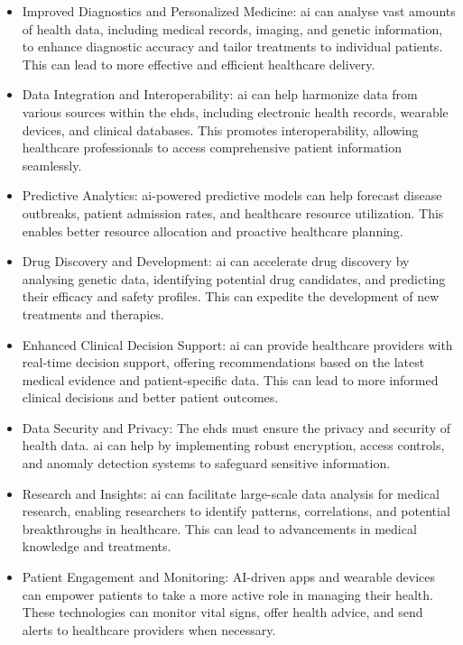 \begin{itemize}
    \item Improved Diagnostics and Personalized Medicine: \ac{ai} can analyse vast amounts of health data, including medical records, imaging, and genetic information, to enhance diagnostic accuracy and tailor treatments to individual patients. This can lead to more effective and efficient healthcare delivery.
\item Data Integration and Interoperability: \ac{ai} can help harmonize data from various sources within the \ac{ehds}, including electronic health records, wearable devices, and clinical databases. This promotes interoperability, allowing healthcare professionals to access comprehensive patient information seamlessly.

\item Predictive Analytics: \ac{ai}-powered predictive models can help forecast disease outbreaks, patient admission rates, and healthcare resource utilization. This enables better resource allocation and proactive healthcare planning.

\item Drug Discovery and Development: \ac{ai} can accelerate drug discovery by analysing genetic data, identifying potential drug candidates, and predicting their efficacy and safety profiles. This can expedite the development of new treatments and therapies.

\item Enhanced Clinical Decision Support: \ac{ai} can provide healthcare providers with real-time decision support, offering recommendations based on the latest medical evidence and patient-specific data. This can lead to more informed clinical decisions and better patient outcomes.

\item Data Security and Privacy: The \ac{ehds} must ensure the privacy and security of health data. \ac{ai} can help by implementing robust encryption, access controls, and anomaly detection systems to safeguard sensitive information.

\item Research and Insights: \ac{ai} can facilitate large-scale data analysis for medical research, enabling researchers to identify patterns, correlations, and potential breakthroughs in healthcare. This can lead to advancements in medical knowledge and treatments.

\item Patient Engagement and Monitoring: AI-driven apps and wearable devices can empower patients to take a more active role in managing their health. These technologies can monitor vital signs, offer health advice, and send alerts to healthcare providers when necessary.


\end{itemize}
